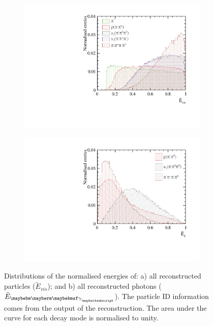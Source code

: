 \begin{figure}[htbp]
\centering
\begin{subfigure}[b]{0.45\textwidth}
 \includegraphics[width=\textwidth]{tau/var3/eVisRatio_100GeV_improved_zoom.pdf}
  \caption{}
  \label{fig:tauVarEVis}
\end{subfigure}
\begin{subfigure}[b]{0.45\textwidth}
 \includegraphics[width=\textwidth]{tau/var3/ePhotonRatio_100GeV_improved_zoom.pdf}
  \caption{}
  \label{fig:tauVarEPhoton}
\end{subfigure}
\caption
{Distributions of  the normalised energies of: a) all reconstructed particles ($\tilde{E}_{vis}$); and b) all reconstructed  photons ($\tilde{E}_{\Pgg}$). The particle ID information comes from the output of the \pandora reconstruction. The area under the curve for each decay mode is normalised to unity.}
\label{fig:tauVar3}
\end{figure}

